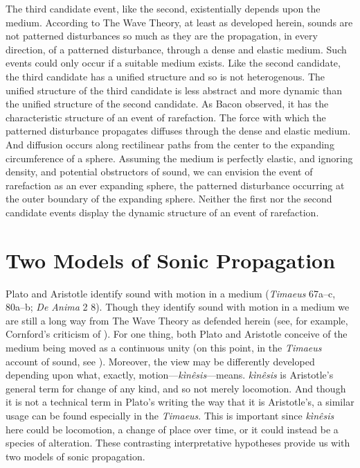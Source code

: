 \documentclass[12pt]{article}
\begin{document}
The third candidate event, like the second, existentially depends upon the medium. According to The Wave Theory, at least as developed herein, sounds are not patterned disturbances so much as they are the propagation, in every direction, of a patterned disturbance, through a dense and elastic medium. Such events could only occur if a suitable medium exists. Like the second candidate, the third candidate has a unified structure and so is not heterogenous. The unified structure of the third candidate is less abstract and more dynamic than the unified structure of the second candidate. As Bacon observed, it has the characteristic structure of an event of rarefaction. The force with which the patterned disturbance propagates diffuses through the dense and elastic medium. And diffusion occurs along rectilinear paths from the center to the expanding circumference of a sphere. Assuming the medium is perfectly elastic, and ignoring density, and potential obstructors of sound, we can envision the event of rarefaction as an ever expanding sphere, the patterned disturbance occurring at the outer boundary of the expanding sphere. Neither the first nor the second candidate events display the dynamic structure of an event of rarefaction.




\section{Two Models of Sonic Propagation} %
\label{sec:two_models_of_sonic_propagation}

Plato and Aristotle identify sound with motion in a medium (\emph{Timaeus} 67a–c, 80a–b; \emph{De Anima} 2 8). Though they identify sound with motion in a medium we are still a long way from The Wave Theory as defended herein (see, for example, Cornford's \citeyear[320 n.1]{Cornford:1935fk} criticism of \citealt{Archer-Hind:1888qd}). For one thing, both Plato and Aristotle conceive of the medium being moved as a continuous unity (on this point, in the \emph{Timaeus} account of sound, see \citealt[109]{Beare:1906uq}). Moreover, the view may be differently developed depending upon what, exactly, motion---\emph{kìnêsis}---means. \emph{kìnêsis} is Aristotle's general term for change of any kind, and so not merely locomotion. And though it is not a technical term in Plato's writing the way that it is Aristotle's, a similar usage can be found especially in the \emph{Timaeus}. This is important since \emph{kìnêsis} here could be locomotion, a change of place over time, or it could instead be a species of alteration. These contrasting interpretative hypotheses provide us with two models of sonic propagation.
\end{document}
